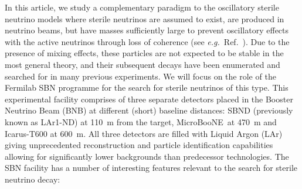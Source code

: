 \documentclass[11pt, a4paper]{article}
\newcommand{\refref}[1]{Ref.~\cite{#1}}
\def\eg{\emph{e.g.}}
\def\muboone{MicroBooNE}
\newcommand{\newtext}[2]{\textcolor{#1}{\ul{#2}}}
\begin{document}
In this article, we study a complementary paradigm to the oscillatory sterile
neutrino models where sterile neutrinos are assumed to exist, are produced in
neutrino beams, but have masses sufficiently large to prevent oscillatory
effects with the active neutrinos through loss of coherence (see \eg\
\refref{Akhmedov:2009rb}).  Due to the presence of mixing effects, these
particles are not expected to be stable in the most general theory, and their
subsequent decays have been enumerated \cite{Atre:2009rg} and searched for in
many previous experiments.
%
We will focus on the role of the Fermilab SBN programme
\cite{Antonello:2015lea} for the search for sterile neutrinos of this type.
%
This experimental facility comprises of three separate detectors placed in the
Booster Neutrino Beam (BNB) at different (short) baseline distances: SBND
(previously known as LAr1-ND) at 110~m from the target, \muboone\ at 470~m and
Icarus-T600 at 600~m.  All three detectors are filled with Liquid Argon (LAr)
giving unprecedented reconstruction and particle identification capabilities
allowing for significantly lower backgrounds than predecessor technologies. 
%
%
The SBN facility has a number of interesting features relevant to the search
for sterile neutrino decay:
\end{document}
